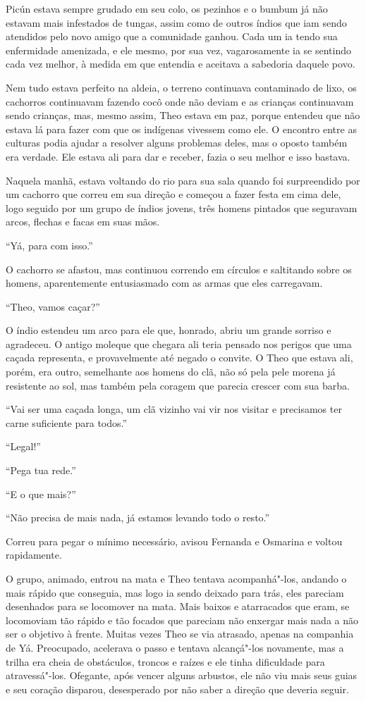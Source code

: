 Picún estava sempre grudado em seu colo, os pezinhos e o bumbum já não
estavam mais infestados de tungas, assim como de outros índios que iam
sendo atendidos pelo novo amigo que a comunidade ganhou. Cada um ia
tendo sua enfermidade amenizada, e ele mesmo, por sua vez, vagarosamente
ia se sentindo cada vez melhor, à medida em que entendia e aceitava a
sabedoria daquele povo.

Nem tudo estava perfeito na aldeia, o terreno continuava contaminado de
lixo, os cachorros continuavam fazendo cocô onde não deviam e as
crianças continuavam sendo crianças, mas, mesmo assim, Theo estava em
paz, porque entendeu que não estava lá para fazer com que os indígenas
vivessem como ele. O encontro entre as culturas podia ajudar a resolver
alguns problemas deles, mas o oposto também era verdade. Ele estava ali
para dar e receber, fazia o seu melhor e isso bastava.

Naquela manhã, estava voltando do rio para sua sala quando foi
surpreendido por um cachorro que correu em sua direção e começou a fazer
festa em cima dele, logo seguido por um grupo de índios jovens, três
homens pintados que seguravam arcos, flechas e facas em suas mãos.

``Yá, para com isso.''

O cachorro se afastou, mas continuou correndo em círculos e saltitando
sobre os homens, aparentemente entusiasmado com as armas que eles carregavam.

``Theo, vamos caçar?''

O índio estendeu um arco para ele que, honrado, abriu um grande sorriso
e agradeceu. O antigo moleque que chegara ali teria pensado nos perigos
que uma caçada representa, e provavelmente até negado o convite. O Theo
que estava ali, porém, era outro, semelhante aos homens do clã, não só
pela pele morena já resistente ao sol, mas também pela coragem que
parecia crescer com sua barba.

``Vai ser uma caçada longa, um clã vizinho vai vir nos visitar e
precisamos ter carne suficiente para todos.''

``Legal!''

``Pega tua rede.''

``E o que mais?''

``Não precisa de mais nada, já estamos levando todo o resto.''

Correu para pegar o mínimo necessário, avisou Fernanda e Osmarina e
voltou rapidamente.

O grupo, animado, entrou na mata e Theo tentava acompanhá"-los, andando o mais
rápido que conseguia, mas logo ia sendo deixado para trás, eles
pareciam desenhados para se locomover na mata. Mais baixos e atarracados
que eram, se locomoviam tão rápido e tão focados que pareciam não
enxergar mais nada a não ser o objetivo à frente. Muitas vezes Theo se via
atrasado, apenas na companhia de Yá. Preocupado, acelerava o passo e
tentava alcançá"-los novamente, mas a trilha era cheia de obstáculos,
troncos e raízes e ele tinha dificuldade para atravessá"-los. Ofegante,
após vencer alguns arbustos, ele não viu mais seus guias e seu coração
disparou, desesperado por não saber a direção que deveria seguir.

